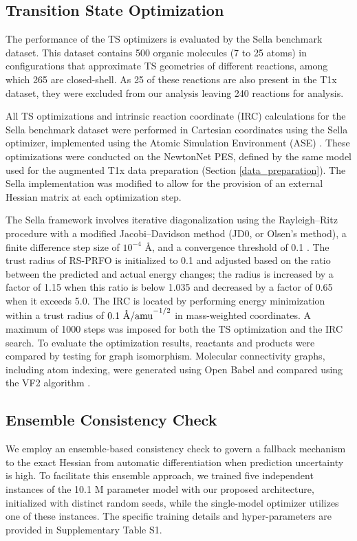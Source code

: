 \documentclass[12pt]{article}
\begin{document}
\subsection{Transition State Optimization} \label{ts_optimization}
The performance of the TS optimizers is evaluated by the Sella benchmark dataset\cite{Sella}. This dataset contains 500 organic molecules (7 to 25 atoms) in configurations that approximate TS geometries of different reactions, among which 265 are closed-shell. As 25 of these reactions are also present in the T1x dataset, they were excluded from our analysis leaving 240 reactions for analysis. 

All TS optimizations and intrinsic reaction coordinate (IRC) calculations for the Sella benchmark dataset were performed in Cartesian coordinates using the Sella optimizer\cite{Sella2}, implemented using the Atomic Simulation Environment (ASE) \cite{ASE}. These optimizations were conducted on the NewtonNet PES, defined by the same model used for the augmented T1x data preparation (Section \ref{data_preparation}). The Sella implementation was modified to allow for the provision of an external Hessian matrix at each optimization step.\par

The Sella framework involves iterative diagonalization using the Rayleigh–Ritz procedure with a modified Jacobi–Davidson method (JD0, or Olsen’s method), a finite difference step size of $10^{-4}$ \r{A}, and a convergence threshold of 0.1 \cite{Sella2}. The trust radius of RS-PRFO is initialized to 0.1 and adjusted based on the ratio between the predicted and actual energy changes; the radius is increased by a factor of 1.15 when this ratio is below 1.035 and decreased by a factor of 0.65 when it exceeds 5.0. The IRC is located by performing energy minimization within a trust radius of $0.1\text{ \r{A}/amu}^{-1/2}$ in mass-weighted coordinates\cite{IRC}. A maximum of 1000 steps was imposed for both the TS optimization and the IRC search. To evaluate the optimization results, reactants and products were compared by testing for graph isomorphism. Molecular connectivity graphs, including atom indexing, were generated using Open Babel\cite{OpenBabel} and compared using the VF2 algorithm \cite{vf2}.

\subsection{Ensemble Consistency Check} \label{ensemble_consistency}
We employ an ensemble-based consistency check to govern a  fallback mechanism to the exact Hessian from automatic differentiation when prediction uncertainty is high. To facilitate this ensemble approach, we trained five independent instances of the 10.1 M parameter model with our proposed architecture, initialized with distinct random seeds, while the single-model optimizer utilizes one of these instances. The specific training details and hyper-parameters are provided in Supplementary Table S1. 
\end{document}
